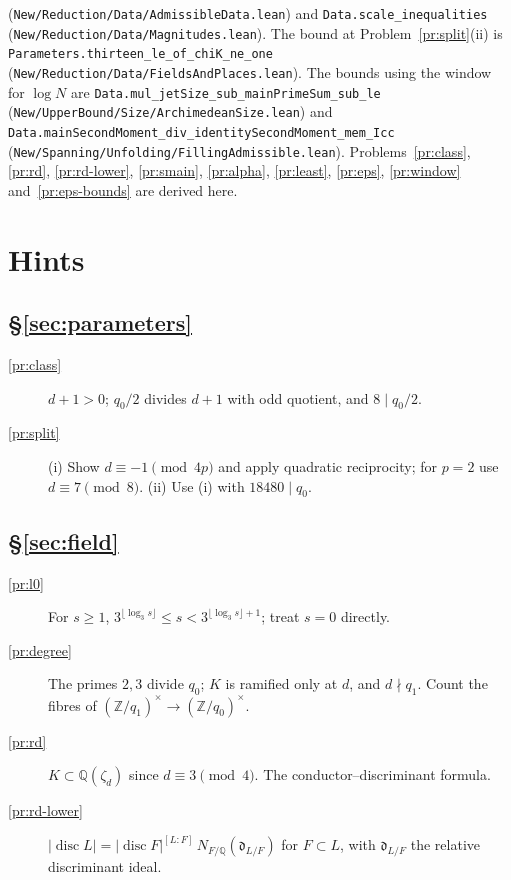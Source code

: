 \documentclass[reqno]{amsart}
\theoremstyle{plain}
\theoremstyle{definition}
\newcommand{\Z}{{\mathbb{Z}}}
\newcommand{\Q}{{\mathbb{Q}}}
\begin{document}
{(\texttt{New/Reduction/Data/AdmissibleData.lean}) and \texttt{Data.scale\_inequalities}
(\texttt{New/Reduction/Data/Magnitudes.lean}).  The bound at Problem~\ref{pr:split}(ii) is \texttt{Parameters.thirteen\_le\_of\_chiK\_ne\_one} (\texttt{New/Reduction/Data/FieldsAndPlaces.lean}).  The bounds using the window for \(\log N\) are \texttt{Data.mul\_jetSize\_sub\_mainPrimeSum\_sub\_le} (\texttt{New/UpperBound/Size/ArchimedeanSize.lean}) and \texttt{Data.mainSecondMoment\_div\_identitySecondMoment\_mem\_Icc} (\texttt{New/Spanning/Unfolding/FillingAdmissible.lean}).  Problems~\ref{pr:class}, \ref{pr:rd}, \ref{pr:rd-lower}, \ref{pr:smain}, \ref{pr:alpha}, \ref{pr:least}, \ref{pr:eps}, \ref{pr:window} and~\ref{pr:eps-bounds} are derived here.\par}

\section*{Hints}

\subsection*{\S\ref{sec:parameters}}
\begin{description}
\item[\ref{pr:class}] \(d + 1 > 0\); \(q_0/2\) divides \(d + 1\) with odd quotient, and \(8 \mid q_0/2\).
\item[\ref{pr:split}] (i) Show \(d \equiv -1 \pmod{4p}\) and apply quadratic reciprocity; for \(p = 2\) use \(d \equiv 7 \pmod 8\).  (ii) Use (i) with \(18480 \mid q_0\).
\end{description}

\subsection*{\S\ref{sec:field}}
\begin{description}
\item[\ref{pr:l0}] For \(s \ge 1\), \(3^{\lfloor\log_3 s\rfloor} \le s < 3^{\lfloor\log_3 s\rfloor + 1}\); treat \(s = 0\) directly.
\item[\ref{pr:degree}] The primes \(2, 3\) divide \(q_0\); \(K\) is ramified only at \(d\), and \(d \nmid q_1\).  Count the fibres of \((\Z/q_1)^\times \to (\Z/q_0)^\times\).
\item[\ref{pr:rd}] \(K \subset \Q(\zeta_d)\) since \(d \equiv 3 \pmod 4\).  The conductor--discriminant formula.
\item[\ref{pr:rd-lower}] \(\lvert\operatorname{disc} L\rvert = \lvert\operatorname{disc} F\rvert^{[L:F]} \, N_{F/\Q}(\mathfrak d_{L/F})\) for \(F \subset L\), with \(\mathfrak d_{L/F}\) the relative discriminant ideal.
\end{description}
\end{document}
